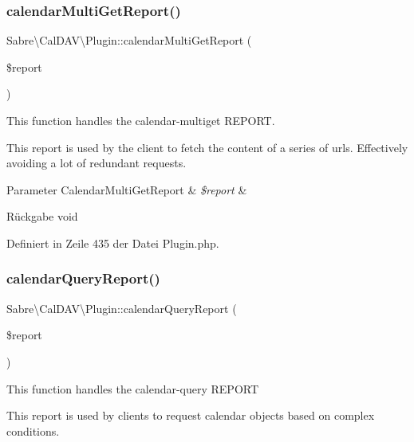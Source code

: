 \subsubsection{\texorpdfstring{calendar\+Multi\+Get\+Report()}{calendarMultiGetReport()}}
{\footnotesize\ttfamily Sabre\textbackslash{}\+Cal\+D\+A\+V\textbackslash{}\+Plugin\+::calendar\+Multi\+Get\+Report (\begin{DoxyParamCaption}\item[{}]{\$report }\end{DoxyParamCaption})}

This function handles the calendar-\/multiget R\+E\+P\+O\+RT.

This report is used by the client to fetch the content of a series of urls. Effectively avoiding a lot of redundant requests.


\begin{DoxyParams}[1]{Parameter}
Calendar\+Multi\+Get\+Report & {\em \$report} & \\
\hline
\end{DoxyParams}
\begin{DoxyReturn}{Rückgabe}
void 
\end{DoxyReturn}


Definiert in Zeile 435 der Datei Plugin.\+php.

\mbox{\label{class_sabre_1_1_cal_d_a_v_1_1_plugin_aea073354cd6ebd0bdd4b59fc63dcc389}} 
\subsubsection{\texorpdfstring{calendar\+Query\+Report()}{calendarQueryReport()}}
{\footnotesize\ttfamily Sabre\textbackslash{}\+Cal\+D\+A\+V\textbackslash{}\+Plugin\+::calendar\+Query\+Report (\begin{DoxyParamCaption}\item[{}]{\$report }\end{DoxyParamCaption})}

This function handles the calendar-\/query R\+E\+P\+O\+RT

This report is used by clients to request calendar objects based on complex conditions.


